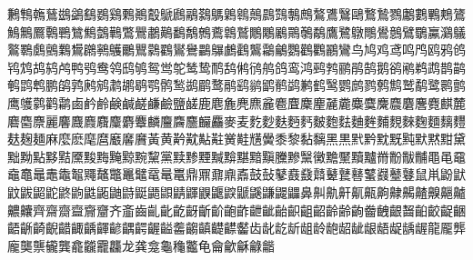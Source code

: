 鶼鶽鶾鶿鷀鷁鷂鷃鷄鷅鷆鷇鷈鷉鷊鷋鷌鷍鷎鷏鷐鷑鷒鷓鷔鷕鷖鷗鷘鷙鷚鷛鷜鷝鷞鷟鷠鷡鷢鷣鷤鷥鷦鷧鷨鷩鷪鷫鷬鷭鷮鷯鷰鷱鷲鷳鷴鷵鷶鷷鷸鷹鷺鷻鷼鷽鷾鷿鸀鸁鸂鸃鸄鸅鸆鸇鸈鸉鸊鸋鸌鸍鸎鸏鸐鸑鸒鸓鸔鸕鸖鸗鸘鸙鸚鸛鸜鸝鸞鸟鸠鸡鸢鸣鸤鸥鸦鸧鸨鸩鸪鸫鸬鸭鸮鸯鸰鸱鸲鸳鸴鸵鸶鸷鸸鸹鸺鸻鸼鸽鸾鸿鹀鹁鹂鹃鹄鹅鹆鹇鹈鹉鹊鹋鹌鹍鹎鹏鹐鹑鹒鹓鹔鹕鹖鹗鹘鹙鹚鹛鹜鹝鹞鹟鹠鹡鹢鹣鹤鹥鹦鹧鹨鹩鹪鹫鹬鹭鹮鹯鹰鹱鹲鹳鹴鹵鹶鹷鹸鹹鹺鹻鹼鹽鹾鹿麀麁麂麃麄麅麆麇麈麉麊麋麌麍麎麏麐麑麒麓麔麕麖麗麘麙麚麛麜麝麞麟麠麡麢麣麤麥麦麧麨麩麪麫麬麭麮麯麰麱麲麳麴麵麶麷麸麹麺麻麼麽麾麿黀黁黂黃黄黅黆黇黈黉黊黋黌黍黎黏黐黑黒黓黔黕黖黗默黙黚黛黜黝點黟黠黡黢黣黤黥黦黧黨黩黪黫黬黭黮黯黰黱黲黳黴黵黶黷黸黹黺黻黼黽黾黿鼀鼁鼂鼃鼄鼅鼆鼇鼈鼉鼊鼋鼌鼍鼎鼏鼐鼑鼒鼓鼔鼕鼖鼗鼘鼙鼚鼛鼜鼝鼞鼟鼠鼡鼢鼣鼤鼥鼦鼧鼨鼩鼪鼫鼬鼭鼮鼯鼰鼱鼲鼳鼴鼵鼶鼷鼸鼹鼺鼻鼼鼽鼾鼿齀齁齂齃齄齅齆齇齈齉齊齋齌齍齎齏齐齑齒齓齔齕齖齗齘齙齚齛齜齝齞齟齠齡齢齣齤齥齦齧齨齩齪齫齬齭齮齯齰齱齲齳齴齵齶齷齸齹齺齻齼齽齾齿龀龁龂龃龄龅龆龇龈龉龊龋龌龍龎龏龐龑龒龓龔龕龖龗龘龙龚龛龜龝龞龟龠龡龢龣龤